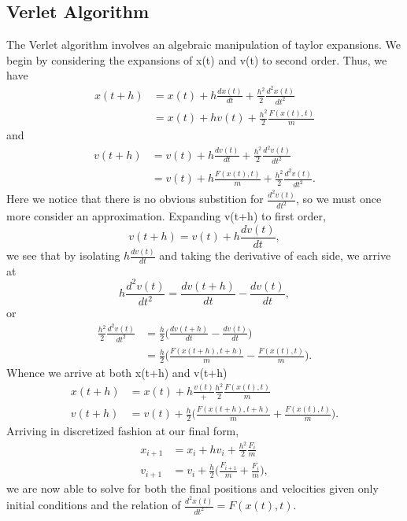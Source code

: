 \documentclass[11pt,a4paper]{article}
\begin{document}
\subsection{Verlet Algorithm}

The Verlet algorithm involves an algebraic manipulation of taylor expansions. We begin by considering the expansions of x(t) and v(t) to second order. Thus, we have
\begin{align}
x(t+h) 	&= x(t) + h\frac{dx(t)}{dt} + \frac{h^2}{2}\frac{d^2x(t)}{dt^2} \\
		&= x(t) + hv(t) + \frac{h^2}{2}\frac{F(x(t),t)}{m}
\end{align}
and
\begin{align}
v(t+h) 	&= v(t) + h\frac{dv(t)}{dt} + \frac{h^2}{2}\frac{d^2v(t)}{dt^2} \\
		&= v(t) + h\frac{F(x(t),t)}{m} + \frac{h^2}{2}\frac{d^2v(t)}{dt^2}.
\end{align}
Here we notice that there is no obvious substition for $\frac{d^2v(t)}{dt^2}$, so we must once more consider an approximation. Expanding v(t+h) to first order,
\begin{equation}
v(t+h) 	= v(t) + h\frac{dv(t)}{dt},
\end{equation}
we see that by isolating $h\frac{dv(t)}{dt}$ and taking the derivative of each side, we arrive at
\begin{equation}
h\frac{d^2v(t)}{dt^2} = \frac{dv(t+h)}{dt} - \frac{dv(t)}{dt},
\end{equation}
or
\begin{align}
\frac{h^2}{2}\frac{d^2v(t)}{dt^2} &= \frac{h}{2}\bigg(\frac{dv(t+h)}{dt} - \frac{dv(t)}{dt}\bigg) \\
									&= \frac{h}{2}\bigg(\frac{F(x(t+h),t+h)}{m} - \frac{F(x(t),t)}{m}\bigg).
\end{align}
Whence we arrive at both x(t+h) and v(t+h)
\begin{align}
x(t+h) 	&= x(t) + h\frac{v(t)} + \frac{h^2}{2}\frac{F(x(t),t)}{m} \\
v(t+h)	&= v(t) + \frac{h}{2}\bigg(\frac{F(x(t+h),t+h)}{m} + \frac{F(x(t),t)}{m}\bigg).
\end{align}
Arriving in discretized fashion at our final form,
\begin{align}
x_{i+1} &= x_i + hv_i + \frac{h^2}{2}\frac{F_i}{m} \\
v_{i+1}	&= v_i + \frac{h}{2}\bigg(\frac{F_{i+1}}{m} + \frac{F_i}{m}\bigg),
\end{align}
we are now able to solve for both the final positions and velocities given only initial conditions and the relation of $\frac{d^2x(t)}{dt^2} = F(x(t), t)$.
\end{document}
